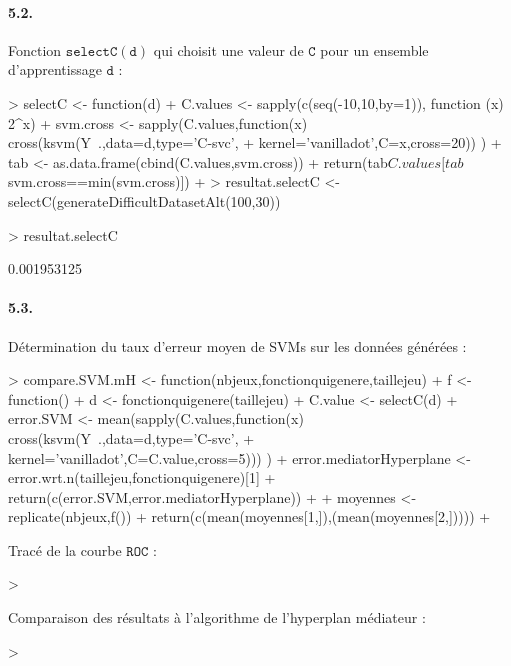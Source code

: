 \documentclass{article}
\begin{document}
\paragraph{5.2.}Fonction $\mathtt{selectC(d)}$ qui choisit une valeur de
 $\mathtt{C}$ pour un ensemble d'apprentissage $\mathtt{d}$ :
\begin{Schunk}
\begin{Sinput}
> selectC <- function(d) {
+ 	C.values <- sapply(c(seq(-10,10,by=1)), function (x) 2^x)
+ 	svm.cross <- sapply(C.values,function(x) cross(ksvm(Y~.,data=d,type='C-svc',
+ 			kernel='vanilladot',C=x,cross=20)) )
+ 	tab <- as.data.frame(cbind(C.values,svm.cross))
+ 	return(tab$C.values[tab$svm.cross==min(svm.cross)])
+ }
> resultat.selectC <- selectC(generateDifficultDatasetAlt(100,30))
\end{Sinput}
\end{Schunk}
\begin{Schunk}
\begin{Sinput}
> resultat.selectC
\end{Sinput}
\begin{Soutput}
[1] 0.001953125
\end{Soutput}
\end{Schunk}
\paragraph{5.3.}Détermination du taux d'erreur moyen de SVMs sur les 
données générées :
\begin{Schunk}
\begin{Sinput}
> compare.SVM.mH <- function(nbjeux,fonctionquigenere,taillejeu) {
+ 	f <- function() {
+ 		d <- fonctionquigenere(taillejeu)
+ 		C.value <- selectC(d)
+ 		error.SVM <- mean(sapply(C.values,function(x) cross(ksvm(Y~.,data=d,type='C-svc',
+ 			kernel='vanilladot',C=C.value,cross=5))) )
+ 		error.mediatorHyperplane <- error.wrt.n(taillejeu,fonctionquigenere)[1]
+ 		return(c(error.SVM,error.mediatorHyperplane))
+ 	}
+ 	moyennes <- replicate(nbjeux,f())
+ 	return(c(mean(moyennes[1,]),(mean(moyennes[2,]))))
+ }
\end{Sinput}
\end{Schunk}
Tracé de la courbe $\mathtt{ROC}$ :
\begin{Schunk}
\begin{Sinput}
> 
\end{Sinput}
\end{Schunk}
Comparaison des résultats à l'algorithme de l'hyperplan médiateur :
\begin{Schunk}
\begin{Sinput}
> 
\end{Sinput}
\end{Schunk}
\end{document}

